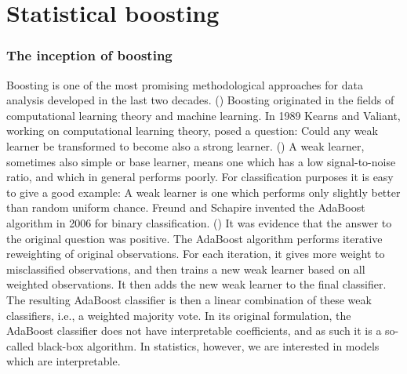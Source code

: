 \chapter{Statistical boosting}
\subsection{The inception of boosting}
Boosting is one of the most promising methodological approaches for data analysis developed in the last two decades. (\cite{mayr14a}) Boosting originated in the fields of computational learning theory and machine learning. In 1989 Kearns and Valiant, working on computational learning theory, posed a question: Could any weak learner be transformed to become also a strong learner. (\cite{kearnsvaliant}) A weak learner, sometimes also simple or base learner, means one which has a low signal-to-noise ratio, and which in general performs poorly. For classification purposes it is easy to give a good example: A weak learner is one which performs only slightly better than random uniform chance. Freund and Schapire invented the AdaBoost algorithm in 2006 for binary classification. (\cite{adaboost}) It was evidence that the answer to the original question was positive. The AdaBoost algorithm performs iterative reweighting of original observations. For each iteration, it gives more weight to misclassified observations, and then trains a new weak learner based on all weighted observations. It then adds the new weak learner to the final classifier. The resulting AdaBoost classifier is then a linear combination of these weak classifiers, i.e., a weighted majority vote. In its original formulation, the AdaBoost classifier does not have interpretable coefficients, and as such it is a so-called black-box algorithm. In statistics, however, we are interested in models which are interpretable.

